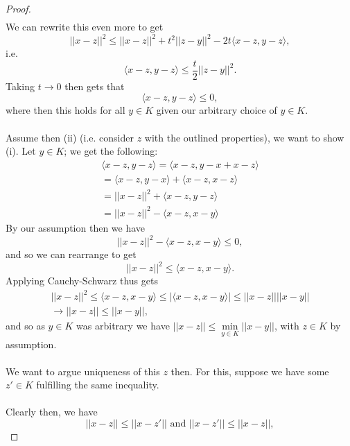 \documentclass[12pt]{article}
\newenvironment{ex}[2][Exercise]{\begin{trivlist}
\item[\hskip \labelsep {\bfseries #1}\hskip \labelsep {\bfseries #2.}]}{\end{trivlist}}
\begin{document}
\begin{ex}{4}
\begin{enumerate}[label=(\alph*)]
\begin{enumerate}[label=(\roman*)]
\begin{proof}
\begin{align*}
                    \end{align*}
                    We can rewrite this even more to get 
                    $$||x - z||^2 \leq ||x - z||^2 + t^2||z - y||^2 - 2t\langle x - z, y - z\rangle,$$
                    i.e. 
                    $$\langle x - z, y - z\rangle \leq \frac{t}{2}||z - y||^2.$$
                    Taking $t \rightarrow 0$ then gets that 
                    $$\langle x - z, y - z\rangle  \leq 0,$$
                    where then this holds for all $y \in K$ given our arbitrary choice of $y \in K$. \\ \\
                    Assume then (ii) (i.e. consider $z$ with the outlined properties), we want to show (i). Let $y \in K$; we get the following:
                    \begin{align*}
                        \langle x - z, y - z \rangle = \langle x - z, y - x + x - z \rangle \\
                        = \langle x - z, y - x \rangle + \langle x - z, x - z \rangle \\
                        = ||x - z||^2 + \langle x - z, y - z \rangle \\
                        = ||x - z||^2 - \langle x - z, x - y \rangle
                    \end{align*}
                    By our assumption then we have 
                    $$||x - z||^2 - \langle x - z, x - y \rangle \leq 0,$$
                    and so we can rearrange to get 
                    $$||x - z||^2 \leq \langle x - z, x - y \rangle.$$
                    Applying Cauchy-Schwarz thus gets
                    \begin{align*}
                        ||x - z||^2 \leq \langle x - z, x - y \rangle \leq |\langle x - z, x - y \rangle| \leq ||x - z||||x - y|| \\
                        \longrightarrow ||x - z|| \leq ||x - y||,
                    \end{align*}
                    and so as $y \in K$ was arbitrary we have $||x - z|| \leq \underset{y \in K}{\min} ||x - y||$, with $z \in K$ by assumption. \\ \\
                    We want to argue uniqueness of this $z$ then. For this, suppose we have some $z' \in K$ fulfilling the same inequality. \\ \\
                    Clearly then, we have
                    $$||x - z|| \leq ||x - z'|| \text{ and } ||x - z'|| \leq ||x - z||,$$

\end{proof}
\end{enumerate}
\end{enumerate}
\end{ex}
\end{document}

